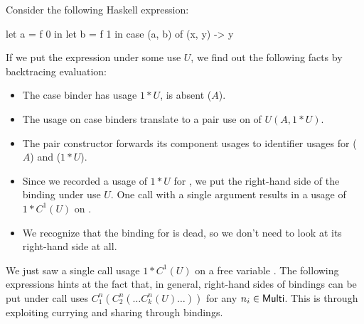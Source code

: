 \begin{example} 
Consider the following Haskell expression:

\begin{haskellcode}
let a = f 0 
in let b = f 1 
   in case (a, b) of
        (x, y) -> y
\end{haskellcode}

If we put the expression under some use $U$, we find out the following facts by backtracing evaluation:

\begin{itemize}
\item The case binder  has usage $1*U$,  is absent ($A$).
\item The usage on case binders translate to a pair use on  of $U(A,1*U)$.
\item The pair constructor forwards its component usages to identifier usages for  ($A$) and  ($1*U$).
\item Since we recorded a usage of $1*U$ for , we put the right-hand side of the binding under use $U$. 
      One call with a single argument results in a usage of $1*C^1(U)$ on .
\item We recognize that the binding for  is dead, so we don't need to look at its right-hand side at all.
\end{itemize}
\end{example}

We just saw a single call usage $1*C^1(U)$ on a free variable . 
The following expressions hints at the fact that, in general, right-hand sides of bindings can be put under call uses $C^n_1(C^n_2(\ldots C^n_k(U)\ldots))$ for any $n_i\in\text{\textsf{Multi}}$.
This is through exploiting currying and sharing through bindings.

